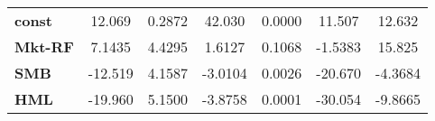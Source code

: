 \begin{center}
\begin{tabular}{lcccccc}
\midrule
\textbf{const}  &       12.069       &       0.2872       &      42.030     &      0.0000      &       11.507      &       12.632       \\
\textbf{Mkt-RF} &       7.1435       &       4.4295       &      1.6127     &      0.1068      &      -1.5383      &       15.825       \\
\textbf{SMB}    &      -12.519       &       4.1587       &     -3.0104     &      0.0026      &      -20.670      &      -4.3684       \\
\textbf{HML}    &      -19.960       &       5.1500       &     -3.8758     &      0.0001      &      -30.054      &      -9.8665       \\
\bottomrule
\end{tabular}
\end{center}
